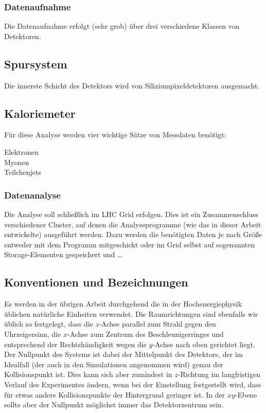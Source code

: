 \subsubsection{Datenaufnahme}
\label{cha:aufnahme}
Die Datenaufnahme erfolgt (sehr grob) über drei verschiedene Klassen von
Detektoren.

\subsection{Spursystem}
Die innerste Schicht des Detektors wird von Siliziumpixeldetektoren ausgemacht.

\subsection{Kaloriemeter}

Für diese Analyse werden vier wichtige Sätze von Messdaten benötigt:
\begin{description}
  \item[Elektronen] %
  \item[Myonen] %
  \item[Teilchenjets] %
\end{description}
\subsubsection{Datenanalyse}
Die Analyse soll schließlich im LHC Grid erfolgen. Dies ist ein Zusammenschluss
verschiedener Cluster, auf denen die Analyseprogramme (wie das in dieser Arbeit
entwickelte) ausgeführt werden. Dazu werden die benötigten Daten je nach Größe
entweder mit dem Programm mitgeschickt oder im Grid selbst auf sogenannten
Storage-Elementen gespeichert und \dots

\subsection{Konventionen und Bezeichnungen}
\label{cha:conv}
Es werden in der übrigen Arbeit durchgehend die in der Hochenergiephysik
üblichen natürliche Einheiten verwendet. Die Raumrichtungen sind ebenfalls wir
üblich so festgelegt, dass die $z$-Achse parallel zum Strahl gegen den
Uhrzeigersinn, die $x$-Achse zum Zentrum des Beschleunigerringes und entsprechend
der Rechtshändigkeit wegen die $y$-Achse nach oben gerichtet liegt. Der Nullpunkt
des Systems ist dabei der Mittelpunkt des Detektors, der im Idealfall (der auch
in den Simulationen angenommen wird) genau der Kollisionspunkt ist.  Dies kann
sich aber zumindest in $z$-Richtung im langfristigen Verlauf des Experimentes
ändern, wenn bei der Einstellung festgestellt wird, dass für etwas andere
Kollisionspunkte der Hintergrund geringer ist. In der $xy$-Ebene sollte aber der
Nullpunkt möglichst immer das Detektorzentrum sein.

